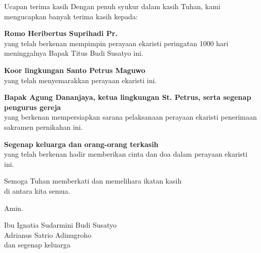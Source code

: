 \documentclass[a5paper,headsepline,titlepage,12pt,nnormalheadings,DIVcalc,twoside]{scrbook}
\newcommand{\namaalm}{Bapak Titus Budi Susatyo}
\newcommand{\namaromo}{Heribertus Suprihadi Pr.}
\begin{document}
\newpage
\begin{flushright}
{\Large Ucapan terima kasih}
\noindent Dengan penuh syukur dalam kasih Tuhan, kami mengucapkan banyak
terima kasih kepada:
\large

\textbf{Romo \namaromo}\\
yang telah berkenan mempimpin perayaan ekaristi peringatan 1000 hari meninggalnya \namaalm
ini.

\textbf{Koor lingkungan Santo Petrus Maguwo}\\
yang telah menyemarakkan perayaan ekaristi ini.

\textbf{Bapak Agung Dananjaya, ketua
lingkungan St. Petrus, serta segenap pengurus gereja}\\
yang berkenan mempersiapkan sarana pelaksanaan perayaan ekaristi penerimaan
sakramen pernikahan ini. 

\textbf{Segenap keluarga dan orang-orang terkasih}\\
yang telah berkenan hadir memberikan cinta dan doa dalam perayaan
ekaristi ini.

Semoga Tuhan memberkati dan memelihara ikatan kasih\\ di antara kita semua.

Amin.

\bigskip 

Ibu Ignatia Sudarmini Budi Susatyo\\
Adrianus Satrio Adinugroho\\
dan segenap keluarga
\end{flushright}
\end{document}
